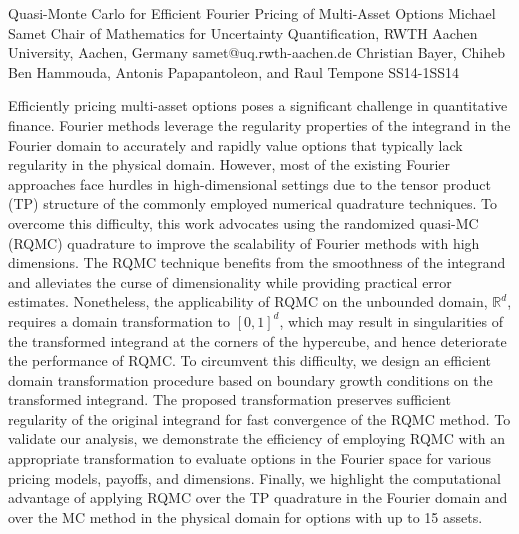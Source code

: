 \begin{talk}
  {Quasi-Monte Carlo for Efficient Fourier Pricing of Multi-Asset Options}%
  {Michael Samet}%
  {Chair of Mathematics for Uncertainty Quantification, RWTH Aachen University, Aachen, Germany}%
  {samet@uq.rwth-aachen.de}%
  {Christian Bayer, Chiheb Ben Hammouda, Antonis Papapantoleon, and Raul Tempone}%
{}{}{SS14-1}{SS14}

			
Efficiently pricing multi-asset options poses a significant challenge in quantitative finance. Fourier methods leverage the regularity properties of the integrand in the Fourier domain to accurately and rapidly value options that typically lack regularity in the physical domain.  However, most of the existing Fourier approaches face hurdles in high-dimensional settings due to the tensor product (TP) structure of the commonly employed numerical quadrature techniques. To overcome this difficulty,  this work advocates using the randomized quasi-MC (RQMC) quadrature to improve the scalability of Fourier methods with high dimensions. The RQMC technique benefits from the smoothness of the integrand and alleviates the curse of dimensionality while providing practical error estimates. Nonetheless, the applicability of RQMC on the unbounded domain, $\mathbb{R}^d$, requires a domain transformation to $[0,1]^d$, which may result in singularities of the transformed integrand at the corners of the hypercube, and hence deteriorate the performance of RQMC. To circumvent this difficulty, we design an efficient domain transformation procedure based on boundary growth conditions on the transformed integrand. The proposed transformation preserves sufficient regularity of the original integrand for fast convergence of the RQMC method. To validate our analysis, we demonstrate the efficiency of employing RQMC with an appropriate transformation to evaluate options in the Fourier space for various pricing models, payoffs, and dimensions. Finally, we highlight the computational advantage of applying RQMC over the TP quadrature in the Fourier domain and over the MC method in the physical domain for options with up to 15 assets. \\
 
\medskip


\end{talk}
